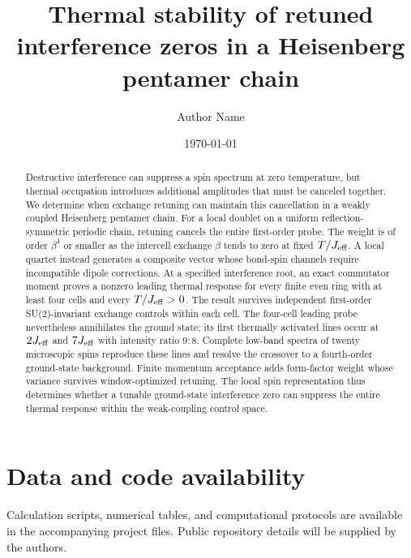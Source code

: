 \documentclass[aps,prb,reprint,amsmath,amssymb,superscriptaddress,longbibliography,nofootinbib,floatfix]{revtex4-2}
\begin{document}
\raggedbottom
\title{Thermal stability of retuned interference zeros in a Heisenberg pentamer chain}
\author{Author Name}
\date{\today}
\begin{abstract}
Destructive interference can suppress a spin spectrum at zero temperature,
but thermal occupation introduces additional amplitudes that must be
canceled together. We determine when exchange retuning can maintain this
cancellation in a weakly coupled Heisenberg pentamer chain.
For a local doublet on a uniform reflection-symmetric periodic chain,
retuning cancels the entire first-order probe.
The weight is of order $\beta^4$ or smaller as the intercell exchange
$\beta$ tends to zero at fixed $T/J_{\rm eff}$.
A local quartet instead generates a composite vector whose bond-spin
channels require incompatible dipole corrections.
At a specified interference root, an exact commutator moment proves a
nonzero leading thermal response for every finite even ring with at
least four cells and every $T/J_{\rm eff}>0$.
The result survives independent first-order SU(2)-invariant exchange
controls within each cell.
The four-cell leading probe nevertheless annihilates the ground state;
its first thermally activated lines occur at $2J_{\rm eff}$ and
$7J_{\rm eff}$ with intensity ratio $9:8$.
Complete low-band spectra of twenty microscopic spins reproduce these
lines and resolve the crossover to a fourth-order ground-state background.
Finite momentum acceptance adds form-factor weight whose variance survives
window-optimized retuning.
The local spin representation thus determines whether a tunable
ground-state interference zero can suppress the entire thermal response
within the weak-coupling control space.
\end{abstract}
\maketitle




\begin{acknowledgments}
\end{acknowledgments}
\section*{Data and code availability}
Calculation scripts, numerical tables, and computational protocols are
available in the accompanying project files. Public repository details
will be supplied by the authors.
\appendix





\end{document}
